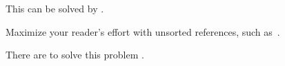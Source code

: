 This can be solved by .

Maximize your reader's effort with unsorted references, such as~\badstyle{[17, 8, 42, 6, 99]}.

There are  
to solve this problem .

